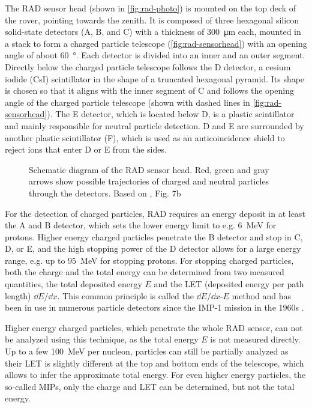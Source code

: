 The \ac{RAD} sensor head (shown in \autoref{fig:rad-photo}) is mounted on the top deck of the rover, pointing towards the zenith. It is composed of three hexagonal silicon solid-state detectors (A, B, and C) with a thickness of \SI{300}{\micro\meter} each, mounted in a stack to form a charged particle telescope (\autoref{fig:rad-sensorhead}) with an opening angle of about \SI{60}{\degree}. Each detector is divided into an inner and an outer segment.
Directly below the charged particle telescope follows the D detector, a cesium iodide (CsI) scintillator in the shape of a truncated hexagonal pyramid. Its shape is chosen so that it aligns with the inner segment of C and follows the opening angle of the charged particle telescope (shown with dashed lines in \autoref{fig:rad-sensorhead}). The E detector, which is located below D, is a plastic scintillator and mainly responsible for neutral particle detection. D and E are surrounded by another plastic scintillator (F), which is used as an anticoincidence shield to reject ions that enter D or E from the sides.

\begin{figure}
	\centering
	
	\caption[Schematic diagram of the \acs{RAD} sensor head]{Schematic diagram of the \ac{RAD} sensor head. Red, green and gray arrows show possible trajectories of charged and neutral particles through the detectors. Based on      \textcite{Hassler-2012-MSLRAD}, Fig. 7b}
	\label{fig:rad-sensorhead}
\end{figure}

For the detection of charged particles, \ac{RAD} requires an energy deposit in at least the A and B detector, which sets the lower energy limit to e.g. \SI{6}{\mega\electronvolt} for protons. Higher energy charged particles penetrate the B detector and stop in C, D, or E, and the high stopping power of the D detector allows for a large energy range, e.g. up to \SI{95}{\mega\electronvolt} for stopping protons. For stopping charged particles, both the charge and the total energy can be determined from two measured quantities, the total deposited energy $E$ and the \ac{LET} (deposited energy per path length) $\dd E/\dd x$. This common principle is called the $\dd E/\dd x$-$E$ method and has been in use in numerous particle detectors since the IMP-1 mission in the 1960s \citep{McDonald-1964}.

Higher energy charged particles, which penetrate the whole \ac{RAD} sensor, can not be analyzed using this technique, as the total energy $E$ is not measured directly. Up to a few \SI{100}{\mega\electronvolt} per nucleon, particles can still be partially analyzed as their \ac{LET} is slightly different at the top and bottom ends of the telescope, which allows to infer the approximate total energy. For even higher energy particles, the so-called \acp{MIP}, only the charge and \ac{LET} can be determined, but not the total energy.


